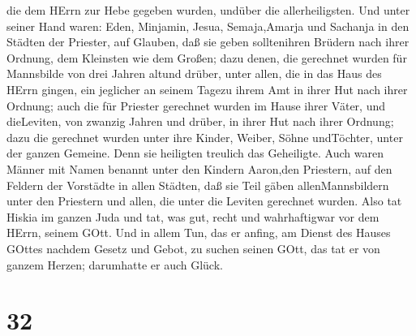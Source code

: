 die dem HErrn zur Hebe gegeben wurden, undüber die allerheiligsten.
 Und unter seiner Hand waren: Eden, Minjamin, Jesua,
Semaja,Amarja und Sachanja in den Städten der Priester, auf Glauben, daß
sie geben solltenihren Brüdern nach ihrer Ordnung, dem Kleinsten wie dem
Großen;  dazu denen, die gerechnet wurden für Mannsbilde
von drei Jahren altund drüber, unter allen, die in das Haus des HErrn
gingen, ein jeglicher an seinem Tagezu ihrem Amt in ihrer Hut nach ihrer
Ordnung;  auch die für Priester gerechnet wurden im Hause
ihrer Väter, und dieLeviten, von zwanzig Jahren und drüber, in ihrer Hut
nach ihrer Ordnung;  dazu die gerechnet wurden unter ihre
Kinder, Weiber, Söhne undTöchter, unter der ganzen Gemeine. Denn sie
heiligten treulich das Geheiligte.  Auch waren Männer mit
Namen benannt unter den Kindern Aaron,den Priestern, auf den Feldern der
Vorstädte in allen Städten, daß sie Teil gäben allenMannsbildern unter
den Priestern und allen, die unter die Leviten gerechnet wurden.
 Also tat Hiskia im ganzen Juda und tat, was gut, recht und
wahrhaftigwar vor dem HErrn, seinem GOtt.  Und in allem
Tun, das er anfing, am Dienst des Hauses GOttes nachdem Gesetz und
Gebot, zu suchen seinen GOtt, das tat er von ganzem Herzen; darumhatte
er auch Glück.

\hypertarget{section-31}{%
\section{32}\label{section-31}}

